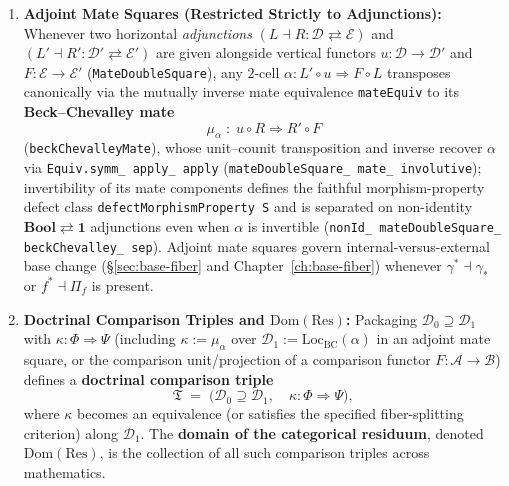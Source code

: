 \begin{definition}
\begin{enumerate}
  \item \textbf{Adjoint Mate Squares (Restricted Strictly to Adjunctions):} Whenever two horizontal \emph{adjunctions} $(L \dashv R : \mathcal{D} \rightleftarrows \mathcal{E})$ and $(L' \dashv R' : \mathcal{D}' \rightleftarrows \mathcal{E}')$ are given alongside vertical functors $u : \mathcal{D} \to \mathcal{D}'$ and $F : \mathcal{E} \to \mathcal{E}'$ (\texttt{MateDoubleSquare}), any $2$-cell $\alpha : L' \circ u \Longrightarrow F \circ L$ transposes canonically via the mutually inverse mate equivalence \texttt{mateEquiv} to its \textbf{Beck--Chevalley mate}
  \[
    \mu_\alpha \;:\; u \circ R \Longrightarrow R' \circ F
  \]
  (\texttt{beckChevalleyMate}), whose unit--counit transposition and inverse recover $\alpha$ via \texttt{Equiv.symm\_ apply\_ apply} (\texttt{mateDoubleSquare\_ mate\_ involutive}); invertibility of its mate components defines the faithful morphism-property defect class \texttt{defectMorphismProperty S} and is separated on non-identity $\mathbf{Bool} \rightleftarrows \mathbf{1}$ adjunctions even when $\alpha$ is invertible (\texttt{nonId\_ mateDoubleSquare\_ beckChevalley\_ sep}). Adjoint mate squares govern internal-versus-external base change (§\ref{sec:base-fiber} and Chapter~\ref{ch:base-fiber}) whenever $\gamma^* \dashv \gamma_*$ or $f^* \dashv \Pi_f$ is present.
  \item \textbf{Doctrinal Comparison Triples and $\mathrm{Dom}(\mathrm{Res})$:} Packaging $\mathcal{D}_0 \supseteq \mathcal{D}_1$ with $\kappa : \Phi \Rightarrow \Psi$ (including $\kappa := \mu_\alpha$ over $\mathcal{D}_1 := \mathrm{Loc}_{\mathrm{BC}}(\alpha)$ in an adjoint mate square, or the comparison unit/projection of a comparison functor $F : \mathcal{A} \to \mathcal{B}$) defines a \textbf{doctrinal comparison triple}
  \[
    \mathfrak{T} \;=\; \bigl(\mathcal{D}_0 \supseteq \mathcal{D}_1, \quad \kappa : \Phi \Longrightarrow \Psi\bigr),
  \]
  where $\kappa$ becomes an equivalence (or satisfies the specified fiber-splitting criterion) along $\mathcal{D}_1$. The \textbf{domain of the categorical residuum}, denoted $\mathrm{Dom}(\mathrm{Res})$, is the collection of all such comparison triples across mathematics.
\end{enumerate}
\end{definition}

